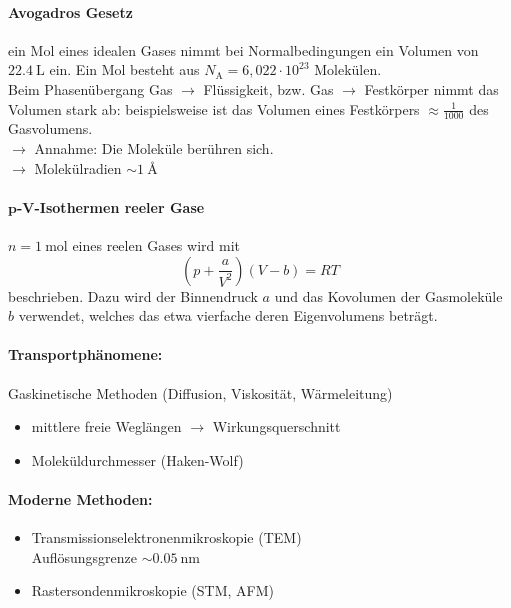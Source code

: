     \paragraph{Avogadros Gesetz} ein Mol eines idealen Gases nimmt bei Normalbedingungen ein Volumen  von $\SI{22,4}{\liter}$ ein. Ein Mol besteht aus $N_{\text{A}} = 6,022 \cdot 10^{23}$ Molekülen.\\[1ex]
    Beim Phasenübergang Gas $\to$ Flüssigkeit, bzw. Gas $\to$ Festkörper nimmt das Volumen stark ab: beispielsweise ist das Volumen eines Festkörpers $\approx\frac1{1000}$ des Gasvolumens.\\
    $\to$ Annahme: Die Moleküle berühren sich.\\
    $\to $ Molekülradien $\sim \SI{1}{\angstrom}$
    
    \paragraph{$\bm{p}$-$\bm{V}$-Isothermen reeler Gase} $n=\SI{1}{\mol}$ eines reelen Gases wird mit 
        \begin{equation}
            \label{1.1}
            \left( p + \frac{a}{V^2} \right) \left( V-b \right) = RT
        \end{equation}
        beschrieben. Dazu wird der Binnendruck $a$ und das Kovolumen der Gasmoleküle $b$ verwendet, welches das etwa vierfache deren Eigenvolumens beträgt.
    \paragraph{Transportphänomene:}
        Gaskinetische Methoden (Diffusion, Viskosität, Wärmeleitung)
        \begin{itemize}[label=$\to$]
            \item mittlere freie Weglängen $\to $ Wirkungsquerschnitt
            \item Moleküldurchmesser (Haken-Wolf)
        \end{itemize}
    \paragraph{Moderne Methoden:}
        \begin{itemize}
            \item Transmissionselektronenmikroskopie (TEM)\\ Auflösungsgrenze $\sim \SI{0,05}{\nano\meter}$
            \item Rastersondenmikroskopie (STM, AFM)
        \end{itemize}
    
